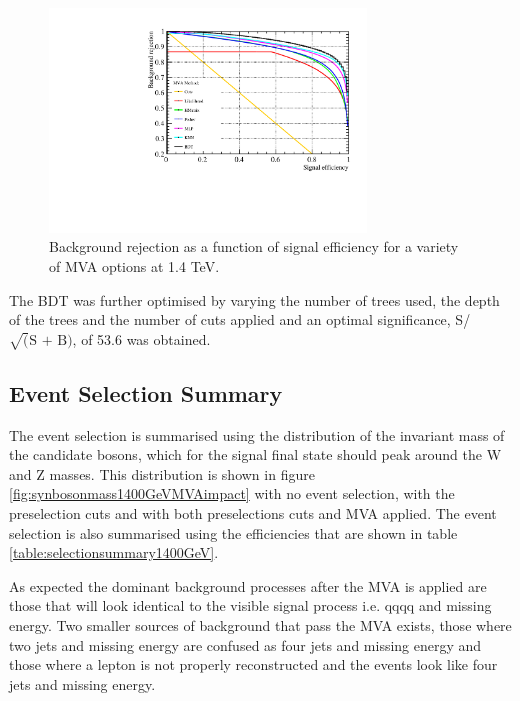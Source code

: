 \begin{figure}
\centering
\includegraphics[width=0.75\textwidth]{PhysicsAnalysis/Plots/MVAPlots/1400GeV/ThesisPlotMVAAlternatives1400GeV.pdf}
\caption[Background rejection as a function of signal efficiency for a variety of MVA options at 1.4 TeV.]{Background rejection as a function of signal efficiency for a variety of MVA options at 1.4 TeV.} 
\label{fig:mvaalternatives1400GeV}
\end{figure}

The BDT was further optimised by varying the number of trees used, the depth of the trees and the number of cuts applied and an optimal significance, S/$\sqrt(\text{S + B})$, of 53.6 was obtained.  


\subsection{Event Selection Summary}
\label{sec:eventselsummary1400GeV}
The event selection is summarised using the distribution of the invariant mass of the candidate bosons, which for the signal final state should peak around the W and Z masses.  This distribution is shown in figure \ref{fig:synbosonmass1400GeVMVAimpact} with no event selection, with the preselection cuts and with both preselections cuts and MVA applied.  The event selection is also summarised using the efficiencies that are shown in table \ref{table:selectionsummary1400GeV}.

As expected the dominant background processes after the MVA is applied are those that will look identical to the visible signal process i.e. qqqq and missing energy.  Two smaller sources of background that pass the MVA exists, those where two jets and missing energy are confused as four jets and missing energy and those where a lepton is not properly reconstructed and the events look like four jets and missing energy.  

